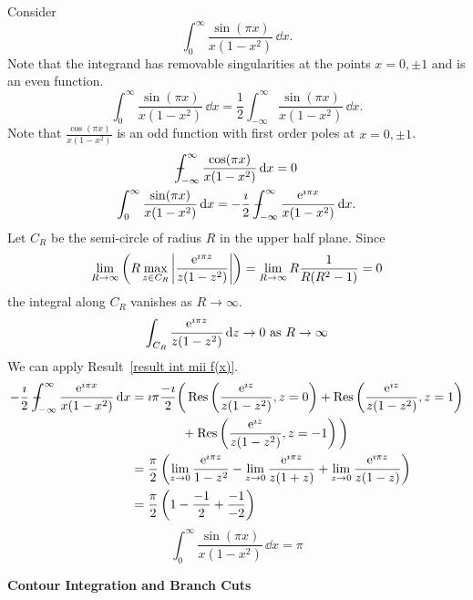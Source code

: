 {%
\begin{Solution}
  \label{solution sin(pi x)/(x(1-x^2))}
  Consider
  \[
  \int_0^\infty \frac{\sin(\pi x)}{x(1-x^2)}\,\dd x.
  \]
  Note that the integrand has removable singularities at the points 
  $x = 0,\pm 1$ and is an even function.
  \[
  \int_0^\infty \frac{\sin(\pi x)}{x(1-x^2)}\,\dd x
  = \frac{1}{2} \int_{-\infty}^\infty \frac{\sin(\pi x)}{x(1-x^2)}\,\dd x.
  \]
  Note that $\displaystyle \frac{\cos(\pi x)}{x(1-x^2)}$ 
  is an odd function with first order poles at $x = 0,\pm 1$.
  \begin{gather*}
    \pv \int_{-\infty}^\infty \frac{\cos(\pi x)}{x(1-x^2)}\,\dd x = 0 \\
    \int_0^\infty \frac{\sin(\pi x)}{x(1-x^2)}\,\dd x
    = - \frac{\imath}{2} \pv \int_{-\infty}^\infty \frac{\e^{\imath \pi x}}{x(1-x^2)}\,\dd x.
  \end{gather*}
  Let $C_R$ be the semi-circle of radius $R$ in the upper half plane.
  Since
  \[
  \lim_{R \to \infty} \left( R \max_{z \in C_R} \left| \frac{\mathop{\mathrm{e}}\nolimits^{\imath \pi z}}{z(1-z^2)} \right| \right)
  = \lim_{R \to \infty} R \frac{1}{R(R^2-1)} = 0
  \]
  the integral along $C_R$ vanishes as $R \to \infty$.  
  \[
  \int_{C_R} \frac{\mathop{\mathrm{e}}\nolimits^{\imath \pi z}}{z(1-z^2)} \,\mathrm{d} z \to 0\ \mathrm{as}\ R \to \infty
  \]
  We can apply Result~\ref{result int mii f(x)}.
  \begin{align*}
    - \frac{\imath}{2} - \negthickspace \negthickspace \negthickspace \negmedspace \int_{-\infty}^\infty \frac{\mathop{\mathrm{e}}\nolimits^{\imath \pi x}}{x(1-x^2)}\,\mathrm{d} x
    &= \imath \pi \frac{-\imath}{2} \bigg(
    \mathop{\mathrm{Res}}\nolimits \left( \frac{\mathop{\mathrm{e}}\nolimits^{\imath z}}{z(1-z^2)}, z = 0 \right)
    + \mathop{\mathrm{Res}}\nolimits \left( \frac{\mathop{\mathrm{e}}\nolimits^{\imath z}}{z(1-z^2)}, z = 1 \right) \\
    & \qquad \qquad + \mathop{\mathrm{Res}}\nolimits \left( \frac{\mathop{\mathrm{e}}\nolimits^{\imath z}}{z(1-z^2)}, z = -1 \right)
    \bigg) \\
    &= \frac{\pi}{2} \left(
      \lim_{z \to 0} \frac{\mathop{\mathrm{e}}\nolimits^{\imath \pi z}}{1-z^2}
      - \lim_{z \to 0} \frac{\mathop{\mathrm{e}}\nolimits^{\imath \pi z}}{z(1+z)}
      + \lim_{z \to 0} \frac{\mathop{\mathrm{e}}\nolimits^{\imath \pi z}}{z(1-z)} \right) \\
    &= \frac{\pi}{2} \left( 1 - \frac{-1}{2} + \frac{-1}{-2} \right)
  \end{align*}
  \[
  \boxed{
    \int_0^\infty \frac{\sin(\pi x)}{x(1-x^2)}\,\dd x = \pi
    }
  \]
\end{Solution}



\begin{large}
  \noindent
  \textbf{Contour Integration and Branch Cuts}
\end{large}
















}
